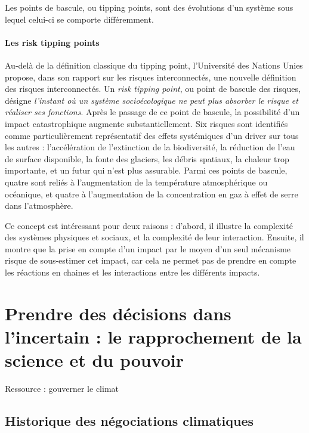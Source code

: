 Les points de bascule, ou tipping points, sont des évolutions d'un système sous lequel celui-ci se comporte différemment. 

\paragraph{Les risk tipping points}

Au-delà de la définition classique du tipping point, l'Université des Nations Unies propose, dans son rapport sur les risques interconnectés, une nouvelle définition des risques interconnectés. Un \textit{risk tipping point}, ou point de bascule des risques, désigne \textit{l'instant où un système socioécologique ne peut plus absorber le risque et réaliser ses fonctions}. Après le passage de ce point de bascule, la possibilité d'un impact catastrophique augmente substantiellement. Six risques sont identifiés comme particulièrement représentatif des effets systémiques d'un driver sur tous les autres : l'accélération de l'extinction de la biodiversité, la réduction de l'eau de surface disponible, la fonte des glaciers, les débris spatiaux, la chaleur trop importante, et un futur qui n'est plus assurable. Parmi ces points de bascule, quatre sont  reliés à l'augmentation de la température atmosphérique ou océanique, et quatre à l'augmentation de la concentration en gaz à effet de serre dans l'atmosphère. \cite{united_nations_university_-_institute_for_environment_and_human_security_unu-ehs_interconnected_2023}

Ce concept est intéressant pour deux raisons : d'abord, il illustre la complexité des systèmes physiques et sociaux, et la complexité de leur interaction. Ensuite, il montre que la prise en compte d'un impact par le moyen d'un seul mécanisme risque de sous-estimer cet impact, car cela ne permet pas de prendre en compte les réactions en chaines et les interactions entre les différents impacts. 

\section{Prendre des décisions dans l'incertain : le rapprochement de la science et du pouvoir}
\label{sect/1/2}


Ressource : gouverner le climat

\subsection{Historique des négociations climatiques}
\label{sect:1.2.1}

